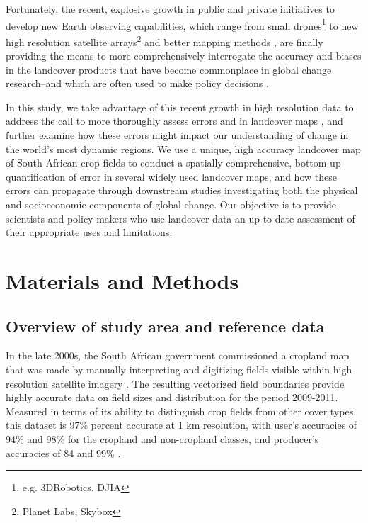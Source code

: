 \documentclass[a4paper]{article}
\begin{document}
Fortunately, the recent, explosive growth in public and private initiatives to develop new Earth observing capabilities, which range from small drones\footnote{e.g. 3DRobotics, DJIA} to new high resolution satellite arrays\footnote{Planet Labs, Skybox} and better mapping methods \citep{fritz_geo-wiki:_2012,tuanmu_global_2014,estes_projected_2013,debats_generalized_2016}, are finally providing the means to more comprehensively interrogate the accuracy and biases in the landcover products that have become commonplace in global change research--and which are often used to make policy decisions \citep{searchinger_high_2015}.  

In this study, we take advantage of this recent growth in high resolution data to address the call to more thoroughly assess errors and in landcover maps \citep{kuemmerle_challenges_2013, olofsson_good_2014,olofsson_global_2012}, and further examine how these errors might impact our understanding of change in the world's most dynamic regions.  We use a unique, high accuracy landcover map of South African crop fields to conduct a spatially comprehensive, bottom-up quantification of error in several widely used landcover maps, and how these errors can propagate through downstream studies investigating both the physical and socioeconomic components of global change. Our objective is to provide scientists and policy-makers who use landcover data an up-to-date assessment of their appropriate uses and limitations. 

\vspace{-0.5 cm}
\section*{Materials and Methods}
\subsection*{Overview of study area and reference data}
In the late 2000s, the South African government commissioned a cropland map that was made by manually interpreting and digitizing fields visible within high resolution satellite imagery \citep{fourie_better_2009}. The resulting vectorized field boundaries provide highly accurate data on field sizes and distribution for the period 2009-2011. Measured in terms of its ability to distinguish crop fields from other cover types, this dataset is 97\% percent accurate at 1 km resolution, with user's accuracies of 94\% and 98\% for the cropland and non-cropland classes, and producer's accuracies of 84 and 99\% \citep[][SI]{estes_platform_2016}.
\end{document}
